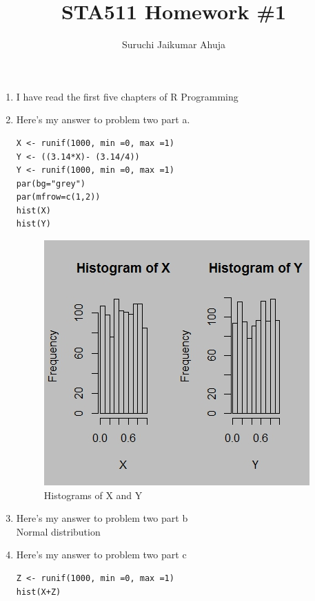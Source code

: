 \documentclass[letterpaper]{article}
\begin{document}
\title{STA511 Homework \#1}
\date{}
\author{Suruchi Jaikumar Ahuja}
\maketitle

\begin{enumerate}

\item I have read the first five chapters of R Programming

\item Here's my answer to problem two part a.
\begin{verbatim} 
X <- runif(1000, min =0, max =1)
Y <- ((3.14*X)- (3.14/4))
Y <- runif(1000, min =0, max =1)
par(bg="grey")
par(mfrow=c(1,2))
hist(X)
hist(Y)
\end{verbatim}
\begin{figure}[ht!]
\centering
\includegraphics[width=\linewidth]{fig1.jpeg}
\caption{ Histograms of X and Y \label{overflow}}
\label{Figure1:Histogram of X and Y}
\end{figure}


\item  Here's my answer to problem two part b
\\Normal distribution

\item  Here's my answer to problem two part c
\begin{verbatim} 
Z <- runif(1000, min =0, max =1)
hist(X+Z)
\end{verbatim}


\end{enumerate}
\end{document}
